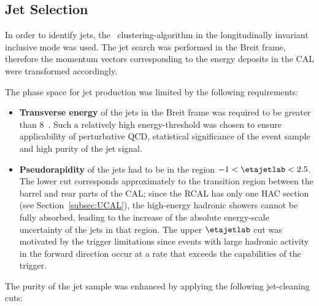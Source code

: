 \subsection{Jet Selection}
\label{subsec:jetselect}
In order to identify jets, the \kt~clustering-algorithm in the longitudinally invariant inclusive mode was used. The jet search was performed in the Breit frame, therefore the momentum vectors corresponding to the energy deposits in the CAL were transformed accordingly. 

The phase space for jet production was limited by the following requirements:
\begin{itemize}
	\item \textbf{Transverse energy} of the jets in the Breit frame was required to be greater than 8~\GeV. Such a relatively high energy-threshold was chosen to ensure applicability of perturbative QCD, statistical significance of the event sample and high purity of the jet signal.
	\item \textbf{Pseudorapidity} of the jets had to be in the region $-1<\etajetlab<2.5$. The lower cut corresponds approximately to the transition region between the barrel and rear parts of the CAL; since the RCAL has only one HAC section (see Section~\ref{subsec:UCAL}), the high-energy hadronic showers cannot be fully absorbed, leading to the increase of the absolute energy-scale uncertainty of the jets in that region. The upper $\etajetlab$ cut was motivated by the trigger limitations since events with large hadronic activity in the forward direction occur at a rate that exceeds the capabilities of the trigger.
	
\end{itemize}
The purity of the jet sample was enhanced by applying the following jet-cleaning cuts:

